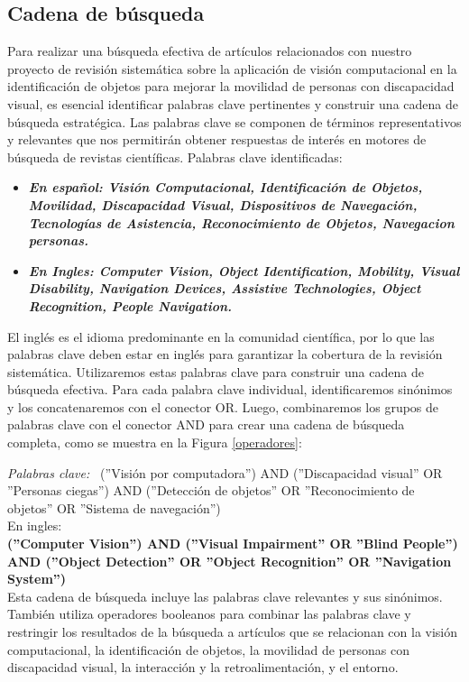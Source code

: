 \documentclass[letterpaper]{article}
\newcommand{\espkeywords}{\noindent\textit{Palabras clave:\ }}
\begin{document}
	\subsection{Cadena de búsqueda}
	Para realizar una búsqueda efectiva de artículos relacionados con nuestro proyecto de revisión sistemática sobre la aplicación de visión computacional en la identificación de objetos para mejorar la movilidad de personas con discapacidad visual, es esencial identificar palabras clave pertinentes y construir una cadena de búsqueda estratégica. Las palabras clave se componen de términos representativos y relevantes que nos permitirán obtener respuestas de interés en motores de búsqueda de revistas científicas.
    Palabras clave identificadas:
    
    \begin{itemize}
        \item \textbf{\textit{En español: Visión Computacional, Identificación de Objetos, Movilidad, Discapacidad Visual, Dispositivos de Navegación, Tecnologías de Asistencia, Reconocimiento de Objetos, Navegacion personas.}}
        \item \textbf{\textit{En Ingles: Computer Vision, Object Identification, Mobility, Visual Disability, Navigation Devices, Assistive Technologies, Object Recognition, People Navigation.}}
    \end{itemize}
    
    El inglés es el idioma predominante en la comunidad científica, por lo que las palabras clave deben estar en inglés para garantizar la cobertura de la revisión sistemática.
    Utilizaremos estas palabras clave para construir una cadena de búsqueda efectiva. Para cada palabra clave individual, identificaremos sinónimos y los concatenaremos con el conector OR. Luego, combinaremos los grupos de palabras clave con el conector AND para crear una cadena de búsqueda completa, como se muestra en la Figura \ref{operadores}:
    
	\espkeywords 
    (''Visión por computadora'') AND (''Discapacidad visual'' OR ''Personas ciegas'') AND (''Detección de objetos'' OR ''Reconocimiento de objetos'' OR ''Sistema de navegación'')\\
	En ingles: \\
	\textbf{(''Computer Vision'') AND (''Visual Impairment'' OR ''Blind People'') AND (''Object Detection'' OR ''Object Recognition'' OR ''Navigation System'')}\\

    Esta cadena de búsqueda incluye las palabras clave relevantes y sus sinónimos. También utiliza operadores booleanos para combinar las palabras clave y restringir los resultados de la búsqueda a artículos que se relacionan con la visión computacional, la identificación de objetos, la movilidad de personas con discapacidad visual, la interacción y la retroalimentación, y el entorno.
\end{document}
